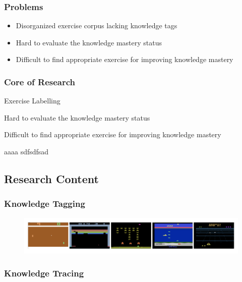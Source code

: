 \documentclass{beamer}
\begin{document}
\begin{frame}
  \frametitle{Problems}
  \begin{itemize}
    \item Disorganized exercise corpus lacking knowledge tags
    \item Hard to evaluate the knowledge mastery status
    \item Difficult to find appropriate exercise for improving knowledge mastery
  \end{itemize}
\end{frame}
\begin{frame}
  \frametitle{Core of Research}
  \begin{block}{Exercise Labelling}

  \end{block}
  \begin{block}{}
    Hard to evaluate the knowledge mastery status
  \end{block}
  \begin{block}{}
    Difficult to find appropriate exercise for improving knowledge mastery
  \end{block}
  \begin{alertblock}{aaaa}
    sdfsdfsad
  \end{alertblock}
\end{frame}
\subsection{Research Content}
\begin{frame}
  \frametitle{Knowledge Tagging}
  \begin{figure}
    \includegraphics[width=1.0\textwidth]{figures/atari.png}
  \end{figure}
\end{frame}


\begin{frame}
  \frametitle{Knowledge Tracing}

\end{frame}
\end{document}
